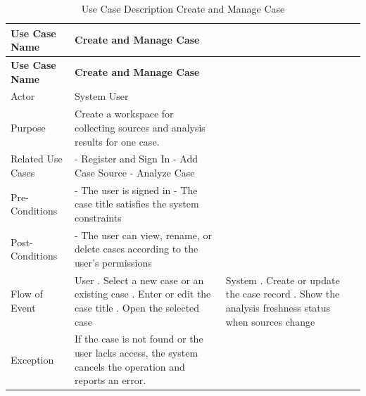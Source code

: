 \begin{longtable}{@{}>{\raggedright\arraybackslash}p{} >{\raggedright\arraybackslash}p{} >{\raggedright\arraybackslash}p{}@{}}
\caption{Use Case Description Create and Manage Case}\label{tab:3-2}\\
\toprule
\textbf{Use Case Name} & \textbf{Create and Manage Case} & \textbf{} \\
\midrule
\endfirsthead
\textbf{Use Case Name} & \textbf{Create and Manage Case} & \textbf{} \\
\midrule
\endhead
Actor & System User &  \\
Purpose & Create a workspace for collecting sources and analysis results for one case. &  \\
Related Use Cases & - Register and Sign In \newline - Add Case Source \newline - Analyze Case &  \\
Pre-Conditions & - The user is signed in \newline - The case title satisfies the system constraints &  \\
Post-Conditions & - The user can view, rename, or delete cases according to the user's permissions &  \\
Flow of Event & User \newline 1. Select a new case or an existing case \newline 2. Enter or edit the case title \newline 3. Open the selected case & System \newline 1. Create or update the case record \newline 2. Show the analysis freshness status when sources change \\
Exception & If the case is not found or the user lacks access, the system cancels the operation and reports an error. &  \\
\bottomrule
\end{longtable}


